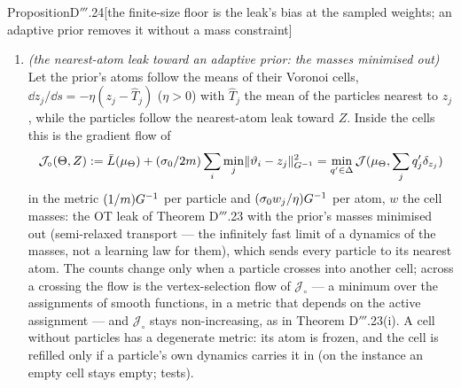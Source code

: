 \begin{thm}{Proposition}{D$'''$.24}[the finite-size floor is the leak's bias at the sampled weights; an adaptive prior
removes it without a mass constraint]
\begin{enumerate}[label=\textup{(\roman*)}]
\begin{equation}
      \tag{B}
    \end{equation}
    $\partial_w$ taken along the zero-sum directions $e_j - e_{K_0}$ and $\tilde C$ the multinomial covariance of
    $(w_1,\dots,w_{K_0-1})$ --- Proposition D$'''$.9's law written on the eigenvectors, and like it a law for samples
    in $W_{\mathrm{adm}}$: at a saddle the replicated stationary point is left by a split (Proposition D$'''$.5), and
    the floor is the split configuration's. Each mode is weighted by
    $h_j\sigma_0^2/(h_j + \sigma_0)^2\le\sigma_0/4$, with equality at $h_j = \sigma_0$: a band-pass centred at the
    level of the leak, at least half its peak for $h_j/\sigma_0\in[3 - 2\sqrt2,3 + 2\sqrt2]$ (a factor 5.8 either
    side). The law is therefore at most $(1/m - 1/M)(\sigma_0/4)\tr(\partial_wx^0\tilde C\partial_wx^{0\T})$, whatever
    the excitation spectrum. A weakly excited mode keeps its bias but hardly shows it in the function; a stiff one
    shows little bias; which modes carry the floor is set first by the gauge's displacement $\partial_wx^0$ and then
    re-weighted toward $h\approx\sigma_0$.
  \item \emph{(the nearest-atom leak toward an adaptive prior: the masses minimised out)} Let the prior's atoms follow
    the means of their Voronoi cells, $\dd z_j/\dd s = -\eta(z_j - \hat T_j)$ ($\eta > 0$) with $\hat T_j$ the mean
    of the particles nearest to $z_j$, while the particles follow the nearest-atom leak toward $Z$. Inside the cells
    this is the gradient flow of
    \[
      \mathcal{J}_\circ(\Theta,Z) := \bar L(\mu_\Theta)
      + (\sigma_0/2m)\sum_i\min_j\lVert \vartheta_i - z_j\rVert^2_{G^{-1}}
      = \min_{q'\in\Delta}\mathcal{J}(\mu_\Theta,\sum_jq'_j\delta_{z_j})
    \]
    in the metric $(1/m)G^{-1}$ per particle and $(\sigma_0w_j/\eta)G^{-1}$ per atom, $w$ the cell masses: the OT leak
    of Theorem D$'''$.23 with the prior's masses minimised out (semi-relaxed transport --- the infinitely fast limit of
    a dynamics of the masses, not a learning law for them), which sends every particle to its nearest atom. The counts
    change only when a particle crosses into another cell; across a crossing the flow is the vertex-selection flow of
    $\mathcal{J}_\circ$ --- a minimum over the assignments of smooth functions, in a metric that depends on the active
    assignment --- and $\mathcal{J}_\circ$ stays non-increasing, as in Theorem D$'''$.23(i). A cell without particles
    has a degenerate metric: its atom is frozen, and the cell is refilled only if a particle's own dynamics carries it
    in (on the instance an empty cell stays empty; tests).

\end{enumerate}
\end{thm}
